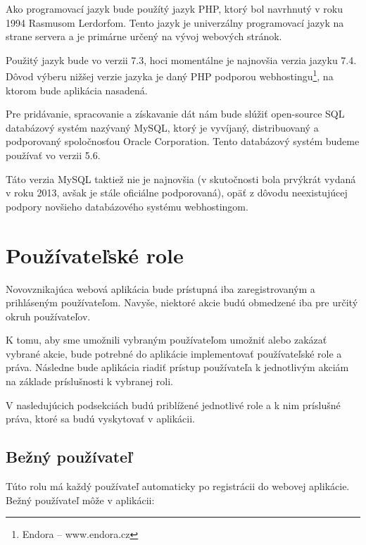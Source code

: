 Ako programovací jazyk bude použítý jazyk PHP, ktorý bol navrhnutý v roku 1994 Rasmusom Lerdorfom. Tento jazyk je univerzálny programovací jazyk na strane servera a je primárne určený na vývoj webových stránok.\cite{co-je-php}

Použitý jazyk bude vo verzii 7.3, hoci momentálne je najnovšia verzia jazyku 7.4\cite{verzie-php}.
Dôvod výberu nižšej verzie jazyka je daný PHP podporou webhostingu\footnote{Endora -- www.endora.cz}, na ktorom bude aplikácia nasadená.

Pre pridávanie, spracovanie a získavanie dát nám bude slúžiť open-source SQL databázový systém nazývaný MySQL, ktorý je vyvíjaný, distribuovaný a podporovaný spoločnosťou Oracle Corporation\cite{co-je-mysql}. Tento databázový systém budeme používať vo verzii 5.6.

Táto verzia MySQL taktiež nie je najnovšia (v skutočnosti bola prvýkrát vydaná v roku 2013, avšak je stále oficiálne podporovaná\cite{verzie-mysql}), opäť z dôvodu neexistujúcej podpory novšieho databázového systému webhostingom.

\section{Používateľské role}\label{pouzivatelske-role}
Novovznikajúca webová aplikácia bude prístupná iba zaregistrovaným a prihláseným používateľom. Navyše, niektoré akcie budú obmedzené iba pre určitý okruh používateľov.

K tomu, aby sme umožnili vybraným používateľom umožniť alebo zakázať vybrané akcie, bude potrebné do aplikácie implementovať používateľské role a práva. Následne bude aplikácia riadiť prístup používateľa k jednotlivým akciám na základe príslušnosti k vybranej roli.

V nasledujúcich podsekciách budú priblížené jednotlivé role a k nim príslušné práva, ktoré sa budú vyskytovať v aplikácii.

\subsection{Bežný používateľ}
Túto rolu má každý používateľ automaticky po registrácii do webovej aplikácie. Bežný používateľ môže v aplikácii: 

